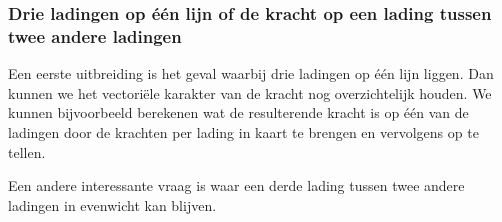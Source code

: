 \documentclass{ximera}
\begin{document}
\subsubsection{Drie ladingen op één lijn of de kracht op een lading tussen twee andere ladingen}
Een eerste uitbreiding is het geval waarbij drie ladingen op één lijn liggen. Dan kunnen we het vectoriële karakter van de kracht nog overzichtelijk houden. We kunnen bijvoorbeeld berekenen wat de resulterende kracht is op één van de ladingen door de krachten per lading in kaart te brengen en vervolgens op te tellen.

Een andere interessante vraag is waar een derde lading tussen twee andere ladingen in evenwicht kan blijven.

\end{document}
